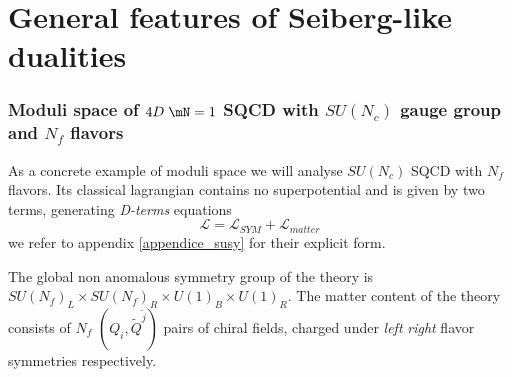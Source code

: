 
\section{General features of Seiberg-like dualities}

\begin{comment}
~ "Classically, and to all orders of perturbation theory, the electric and magnetic
   theories have different moduli spaces of vacua – it is only after taking nonperturbative
   effects into account that they are seen to be identical. For example, in
   the electric theory there is a classical constraint rankhMi ≤ Nc. In the dual theory,
   M is an independent field whose expectation value is unconstrained to all orders of
   perturbation theory – the constraint arises in the dual theory by quantum effects!"
   pag 27 di lectures

\end{comment}

\subsubsection{Moduli space of $4D \; \mN=1$ SQCD with $SU(N_c)$ gauge group and $N_f$ flavors}
As a concrete example of moduli space we will analyse $SU(N_c)$ SQCD with $N_f$ flavors.
Its classical lagrangian contains no superpotential and is given by two terms, generating \emph{D-terms} equations
\begin{equation}
\mathcal{L } =  \mathcal{L }_{SYM} + \mathcal{L }_{matter} 
\end{equation}
we refer to appendix \ref{appendice_susy} for their explicit form.

The global non anomalous symmetry group of the theory is $SU(N_f)_L \times SU(N_f)_R \times U(1)_B \times U(1)_R$. 
The matter content of the theory consists of $N_f$ $(Q_i, \tilde{Q}^{\tilde{j}})$ pairs of chiral fields, charged under \emph{left}  \emph{right} flavor symmetries respectively. 

